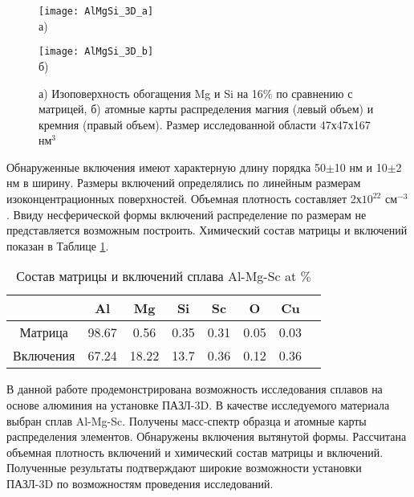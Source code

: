 \begin{figure}[htbp]
	\begin{minipage}[b][][b]{0.49\textwidth}\centering
		\texttt{[image: AlMgSi\_3D\_a]} \\ а)
	\end{minipage}
	\begin{minipage}[b][][b]{0.49\textwidth}\centering
		\texttt{[image: AlMgSi\_3D\_b]} \\ б)
	\end{minipage}
	\caption{а) Изоповерхность обогащения Mg и Si на 16$\%$ по сравнению с матрицей, б) атомные карты распределения магния (левый объем) и кремния (правый объем). Размер исследованной области 47х47х167 нм$^3$}
	\label{fig:AlMgSi_3D}
\end{figure} 

Обнаруженные включения имеют характерную длину порядка 50$\pm$10 нм и 10$\pm$2 нм в ширину. Размеры включений определялись по линейным размерам изоконцентрационных поверхностей. Объемная плотность составляет 2х$10^{22}$ см$^{-3}$. Ввиду несферической формы включений распределение по размерам не представляется возможным построить. Химический состав матрицы и включений показан в Таблице \cref{tab:AlMgSi_table}.

\begin{table} [htbp]
	\centering
		\caption{Состав матрицы и включений сплава Al-Mg-Sc at $\%$}%
		\label{tab:AlMgSi_table}%
		\begin{SingleSpace}
			\begin{tabular}{| c | c | c | c | c | c | c | c |}
				\hline
				  			& Al      & Mg     & Si    & Sc     & O     & Cu     \\ \hline
				Матрица     & 98.67   & 0.56   & 0.35  & 0.31   & 0.05  & 0.03   \\ \hline
				Включения   & 67.24   & 18.22  & 13.7  & 0.36   & 0.12  & 0.36   \\ \hline				
			\end{tabular}%
		\end{SingleSpace}
\end{table}

В данной работе продемонстрирована возможность исследования сплавов на основе алюминия на установке ПАЗЛ-3D. В качестве исследуемого материала выбран сплав Al-Mg-Sc. Получены масс-спектр образца и атомные карты распределения элементов. Обнаружены включения вытянутой формы. Рассчитана объемная плотность включений и химический состав матрицы и включений. Полученные результаты подтверждают широкие возможности установки ПАЗЛ-3D по возможностям проведения исследований.

